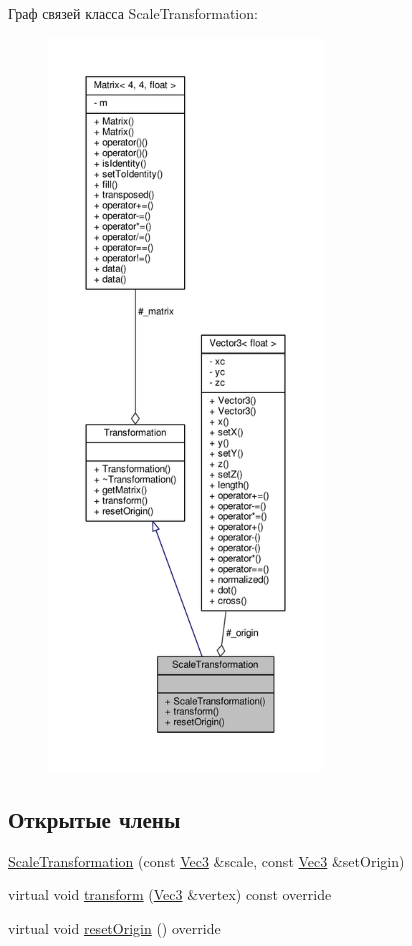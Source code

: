 Граф связей класса Scale\+Transformation\+:
\nopagebreak
\begin{figure}[H]
\begin{center}
\leavevmode
\includegraphics[height=550pt]{da/d3f/class_scale_transformation__coll__graph}
\end{center}
\end{figure}
\subsection*{Открытые члены}
\begin{DoxyCompactItemize}
\item 
\hyperlink{class_scale_transformation_a439313c9450e0f2a8cb7b6dc30f5c055}{Scale\+Transformation} (const \hyperlink{vec3_8h_a221ad8ea4d9be4111628ee1ca22ee3ba}{Vec3} \&scale, const \hyperlink{vec3_8h_a221ad8ea4d9be4111628ee1ca22ee3ba}{Vec3} \&set\+Origin)
\item 
virtual void \hyperlink{class_scale_transformation_a78e8e8f441eea7f39b669ea8bbd1bdc2}{transform} (\hyperlink{vec3_8h_a221ad8ea4d9be4111628ee1ca22ee3ba}{Vec3} \&vertex) const override
\item 
virtual void \hyperlink{class_scale_transformation_a4c23c7d4596a9bb90ee5f854aa3e5a17}{reset\+Origin} () override
\end{DoxyCompactItemize}
